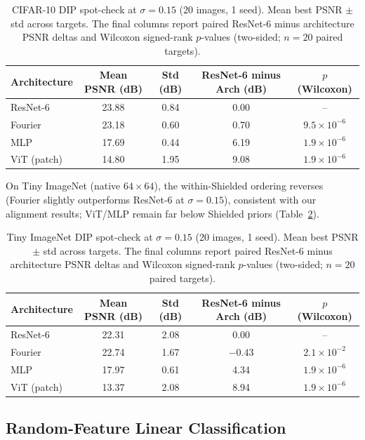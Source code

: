\begin{table}[H]
\centering
\caption{CIFAR-10 DIP spot-check at $\sigma=0.15$ (20 images, 1 seed). Mean best PSNR $\pm$ std across targets. The final columns report paired ResNet-6 minus architecture PSNR deltas and Wilcoxon signed-rank $p$-values (two-sided; $n=20$ paired targets).}
\label{tab:dip_spotcheck_cifar_vit_mlp}
\begin{tabular}{lcccc}
\toprule
Architecture & Mean PSNR (dB) & Std (dB) & ResNet-6 minus Arch (dB) & $p$ (Wilcoxon) \\
\midrule
ResNet-6 & 23.88 & 0.84 & 0.00 & -- \\
Fourier & 23.18 & 0.60 & 0.70 & $9.5\times 10^{-6}$ \\
MLP & 17.69 & 0.44 & 6.19 & $1.9\times 10^{-6}$ \\
ViT (patch) & 14.80 & 1.95 & 9.08 & $1.9\times 10^{-6}$ \\
\bottomrule
\end{tabular}
\end{table}

On Tiny ImageNet (native $64\times 64$), the within-Shielded ordering reverses (Fourier slightly outperforms ResNet-6 at $\sigma=0.15$), consistent with our alignment results; ViT/MLP remain far below Shielded priors (Table~\ref{tab:dip_spotcheck_tiny_vit_mlp}).

\begin{table}[H]
\centering
\caption{Tiny ImageNet DIP spot-check at $\sigma=0.15$ (20 images, 1 seed). Mean best PSNR $\pm$ std across targets. The final columns report paired ResNet-6 minus architecture PSNR deltas and Wilcoxon signed-rank $p$-values (two-sided; $n=20$ paired targets).}
\label{tab:dip_spotcheck_tiny_vit_mlp}
\begin{tabular}{lcccc}
\toprule
Architecture & Mean PSNR (dB) & Std (dB) & ResNet-6 minus Arch (dB) & $p$ (Wilcoxon) \\
\midrule
ResNet-6 & 22.31 & 2.08 & 0.00 & -- \\
Fourier & 22.74 & 1.67 & $-0.43$ & $2.1\times 10^{-2}$ \\
MLP & 17.97 & 0.61 & 4.34 & $1.9\times 10^{-6}$ \\
ViT (patch) & 13.37 & 2.08 & 8.94 & $1.9\times 10^{-6}$ \\
\bottomrule
\end{tabular}
\end{table}

\subsection{Random-Feature Linear Classification}


